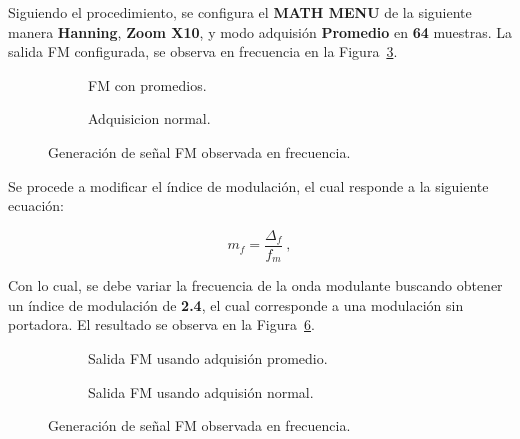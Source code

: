     Siguiendo el procedimiento, se configura el \textbf{MATH MENU} de la siguiente manera  
    \textbf{Hanning}, \textbf{Zoom X10}, y modo adquisión \textbf{Promedio} en 
    \textbf{64} muestras. La salida FM configurada, se observa en frecuencia en la Figura~\ref{fig:Exp6SeñalFMConfigurada}.

      \begin{figure}[H]
        \centering
        \begin{subfigure}[H]{0.48\textwidth}
          \caption{FM con promedios.}
          \label{fig:Exp6SeñalFM}
        \end{subfigure}
        \hfill 
        \begin{subfigure}[H]{0.48\textwidth}
          \caption{Adquisicion normal.}
          \label{fig:Exp6SeñalFMAdquisicionNormal}
        \end{subfigure}
        \caption{Generación de señal FM observada en frecuencia.}
        \label{fig:Exp6SeñalFMConfigurada}
      \end{figure}

    Se procede a modificar el índice de modulación, el cual responde a la 
    siguiente ecuación:

    \begin{equation*}
      m_{f}=\dfrac{\Delta_{f}}{f_{m}}~,
    \end{equation*}

    Con lo cual, se debe variar la frecuencia de la onda modulante buscando obtener 
    un índice de modulación de \textbf{2.4}, el cual corresponde a una modulación sin 
    portadora. El resultado se observa en la 
    Figura~\ref{fig:Exp6SeñalFMindice2_4}.

      \begin{figure}[H]
        \centering
        \begin{subfigure}[H]{0.48\textwidth}
          \caption{Salida FM usando adquisión promedio.}
          \label{fig:Exp6SeñalFMIndice2_4AdquisicionPromedio}
        \end{subfigure}
        \hfill 
        \begin{subfigure}[H]{0.48\textwidth}
          \caption{Salida FM usando adquisión normal.}
          \label{fig:Exp6SeñalFMIndice2_4AdquisicionNormal}
        \end{subfigure}
        \caption{Generación de señal FM observada en frecuencia.}
        \label{fig:Exp6SeñalFMindice2_4}
      \end{figure}   

